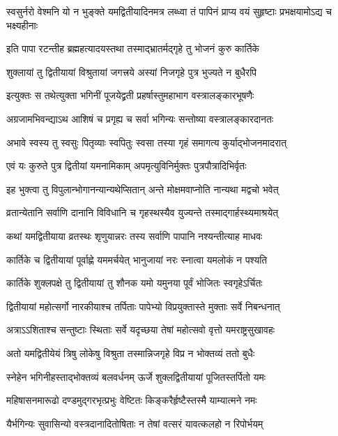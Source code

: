 \twolineshloka
{स्वसुर्नरो वेश्मनि यो न भुङ्क्ते यमद्वितीयादिनमत्र लब्ध्वा}
{तं पापिनं प्राप्य वयं सुहृष्टाः प्रभक्षयामोऽद्य च भक्ष्यहीनाः} %

\twolineshloka
{इति पापा रटन्तीह ब्रह्महत्यादयस्तथा}
{तस्माद्भ्रातर्मद्गृहे तु भोजनं कुरु कार्तिके} %


\twolineshloka
{शुक्लायां तु द्वितीयायां विश्रुतायां जगत्त्रये}
{अस्यां निजगृहे पुत्र भुज्यते न बुधैरपि} %

\twolineshloka
{इत्युक्तः स तथेत्युक्ता भगिनीं पूजयेद्व्रती}
{प्रहर्षास्तुमहाभाग वस्त्रालङ्कारभूषणैः} %

\twolineshloka
{अग्रजामभिवन्द्याऽथ आशिषं च प्रगृह्य च}
{सर्वा भगिन्यः सन्तोष्या वस्त्रालङ्कारदानतः} %

\twolineshloka
{अभावे स्वस्य तु स्वसुः पितृव्याः स्वपितुः स्वसा}
{तस्या गृहं समागत्य कुर्याद्भोजनमादरात्} %

\twolineshloka
{एवं यः कुरुते पुत्र द्वितीयां यमनामिकाम्}
{अपमृत्युविनिर्मुक्तः पुत्रपौत्रादिभिर्वृतः} %

\twolineshloka
{इह भुक्त्वा तु विपुलान्भोगानन्यान्यथेप्सितान्}
{अन्ते मोक्षमवाप्नोति नान्यथा मद्वचो भवेत्} %

\twolineshloka
{व्रतान्येतानि सर्वाणि दानानि विविधानि च}
{गृहस्थस्यैव युज्यन्ते तस्माद्गार्हस्थ्यमाश्रयेत्} %

\twolineshloka
{कथां यमद्वितीयाया व्रतस्थः शृणुयान्नरः}
{तस्य सर्वाणि पापानि नश्यन्तीत्याह माधवः} %


\twolineshloka
{कार्तिके च द्वितीयायां पूर्वाह्णे यममर्चयेत्}
{भानुजायां नरः स्नात्वा यमलोकं न पश्यति} %

\twolineshloka
{कार्तिके शुक्लपक्षे तु द्वितीयायां तु शौनक}
{यमो यमुनया पूर्वं भोजितः स्वगृहेऽर्चितः} %

\twolineshloka
{द्वितीयायां महोत्सर्गो नारकीयाश्च तर्पिताः}
{पापेभ्यो विप्रयुक्तास्ते मुक्ताः सर्वे निबन्धनात्} %

\twolineshloka
{अत्राऽऽशिताश्च सन्तुष्टाः स्थिताः सर्वे यदृच्छया}
{तेषां महोत्सवो वृत्तो यमराष्ट्रसुखावहः} %

\twolineshloka
{अतो यमद्वितीयेयं त्रिषु लोकेषु विश्रुता}
{तस्मान्निजगृहे विप्र न भोक्तव्यं ततो बुधैः} %

\twolineshloka
{स्नेहेन भगिनीहस्ताद्भोक्तव्यं बलवर्धनम्}
{ऊर्जे शुक्लद्वितीयायां पूजितस्तर्पितो यमः} %

\twolineshloka
{महिषासनमारूढो दण्डमुद्गरभृत्प्रभुः}
{वेष्टितः किङ्करैर्हृष्टैस्तस्मै याम्यात्मने नमः} %

\twolineshloka
{यैर्भगिन्यः सुवासिन्यो वस्त्रदानादितोषिताः}
{न तेषां वत्सरं यावत्कलहो न रिपोर्भयम्} %

